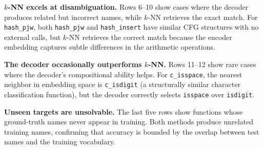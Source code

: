 \documentclass[sigconf,nonacm]{acmart}
\begin{document}
\textbf{$k$-NN excels at disambiguation.} Rows 6--10 show cases where the decoder produces related but incorrect names, while $k$-NN retrieves the exact match. For \texttt{hash\_pjw}, both \texttt{hash\_pjw} and \texttt{hash\_insert} have similar CFG structures with no external calls, but $k$-NN retrieves the correct match because the encoder embedding captures subtle differences in the arithmetic operations.

\textbf{The decoder occasionally outperforms $k$-NN.} Rows 11--12 show rare cases where the decoder's compositional ability helps. For \texttt{c\_isspace}, the nearest neighbor in embedding space is \texttt{c\_isdigit} (a structurally similar character classification function), but the decoder correctly selects \texttt{isspace} over \texttt{isdigit}.

\textbf{Unseen targets are unsolvable.} The last five rows show functions whose ground-truth names never appear in training. Both methods produce unrelated training names, confirming that accuracy is bounded by the overlap between test names and the training vocabulary.

\begin{table}[t]
    \centering
    \caption{Qualitative prediction examples. ``Ext calls'' shows external library calls made by the function. Correct predictions are marked with \checkmark.}
    \label{tab:examples}
\end{table}
\end{document}
